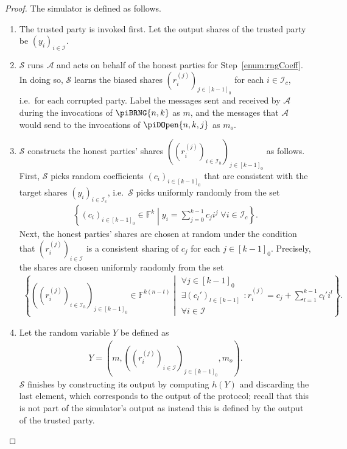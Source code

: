 \documentclass{article}
\newcommand{\set}[2]{\left\{ #1 \middle| #2 \right\}}
\newcommand{\seq}[1]{\left[#1\right]}
\newcommand{\seqZ}[1]{\left[#1\right]_0}
\theoremstyle{remark}
\newcommand{\F}{\mathbb{F}}
\begin{document}
\begin{proof}
	The simulator is defined as follows.
	\begin{enumerate}
		\item The trusted party is invoked first. Let the output shares of the
			trusted party be ${(y_i)}_{i \in \mathcal{I}}$.

		\item $\mathcal{S}$ runs $\mathcal{A}$ and acts on behalf of the honest
			parties for Step~\ref{enum:rngCoeff}. In doing so, $\mathcal{S}$
			learns the biased shares ${\left(r_i^{(j)}\right)}_{j \in
			\seqZ{k-1}}$ for each $i \in \mathcal{I}_c$, i.e.\ for each
			corrupted party. Label the messages sent and received by
			$\mathcal{A}$ during the invocations of $\piBRNG{n,k}$ as $m$, and
			the messages that $\mathcal{A}$ would send to the invocations of
			$\piDOpen{n,k,j}$ as $m_o$.

		\item $\mathcal{S}$ constructs the honest parties' shares
			${\left({\left(r_i^{(j)}\right)}_{i \in \mathcal{I}_h}\right)}_{j
			\in \seqZ{k-1}}$ as follows. First, $\mathcal{S}$ picks random
			coefficients ${(c_i)}_{i \in \seqZ{k-1}}$ that are consistent with
			the target shares ${(y_i)}_{i \in \mathcal{I}_c}$, i.e.\
			$\mathcal{S}$ picks uniformly randomly from the set
			\begin{align*}
				\set{%
					{(c_i)}_{i \in \seqZ{k-1}} \in \F^k
				}{%
					y_i = \sum_{j=0}^{k-1} c_j i^j
					\;
					\forall i \in \mathcal{I}_c
				}.
			\end{align*}
			Next, the honest parties' shares are chosen at random under the
			condition that ${\left(r_i^{(j)}\right)}_{i \in \mathcal{I}}$ is a
			consistent sharing of $c_j$ for each $j \in \seqZ{k-1}$. Precisely,
			the shares are chosen uniformly randomly from the set
			\begin{align*}
				\set{%
					{\left(
						{\left(
							r_i^{(j)}
						\right)}_{i \in \mathcal{I}_h}\right)
					}_{j \in \seqZ{k-1}}
					\in
					\F^{k(n-t)}
				}{%
					\begin{matrix}
						\forall j \in \seqZ{k-1}\\
						\exists {(c_l')}_{l \in \seq{k-1}}\\
						\forall i \in \mathcal{I}
					\end{matrix}
					:
					r_i^{(j)} = c_j + \sum_{l=1}^{k-1} c_l' i^l
				}.
			\end{align*}

		\item Let the random variable $Y$ be defined as
			\begin{align*}
				Y =
				\left(
					m,
					{\left(
						{\left(r_i^{(j)}\right)}_{i \in \mathcal{I}}
					\right)}_{j \in \seqZ{k-1}},
					m_o
				\right).
			\end{align*}
			$\mathcal{S}$ finishes by constructing its output by computing
			$h(Y)$ and discarding the last element, which corresponds to the
			output of the protocol; recall that this is not part of the
			simulator's output as instead this is defined by the output of the
			trusted party.
	\end{enumerate}


\end{proof}
\end{document}
